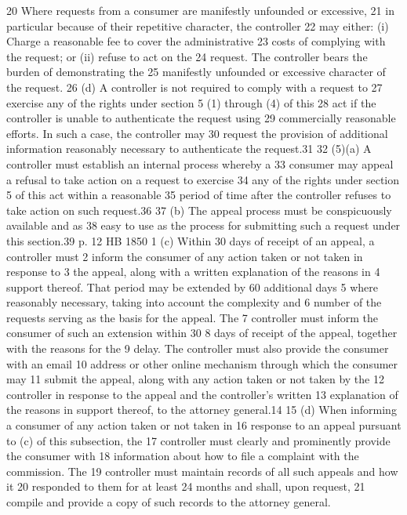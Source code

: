 20 Where requests from a consumer are manifestly unfounded or excessive,
21 in particular because of their repetitive character, the controller
22 may either: (i) Charge a reasonable fee to cover the administrative
23 costs of complying with the request; or (ii) refuse to act on the
24 request. The controller bears the burden of demonstrating the
25 manifestly unfounded or excessive character of the request.
26 (d) A controller is not required to comply with a request to
27 exercise any of the rights under section 5 (1) through (4) of this
28 act if the controller is unable to authenticate the request using
29 commercially reasonable efforts. In such a case, the controller may
30 request the provision of additional information reasonably necessary
to authenticate the request.31
32 (5)(a) A controller must establish an internal process whereby a
33 consumer may appeal a refusal to take action on a request to exercise
34 any of the rights under section 5 of this act within a reasonable
35 period of time after the controller refuses to take action on such
request.36
37 (b) The appeal process must be conspicuously available and as
38 easy to use as the process for submitting such a request under this
section.39
p. 12 HB 1850
1 (c) Within 30 days of receipt of an appeal, a controller must
2 inform the consumer of any action taken or not taken in response to
3 the appeal, along with a written explanation of the reasons in
4 support thereof. That period may be extended by 60 additional days
5 where reasonably necessary, taking into account the complexity and
6 number of the requests serving as the basis for the appeal. The
7 controller must inform the consumer of such an extension within 30
8 days of receipt of the appeal, together with the reasons for the
9 delay. The controller must also provide the consumer with an email
10 address or other online mechanism through which the consumer may
11 submit the appeal, along with any action taken or not taken by the
12 controller in response to the appeal and the controller's written
13 explanation of the reasons in support thereof, to the attorney
general.14
15 (d) When informing a consumer of any action taken or not taken in
16 response to an appeal pursuant to (c) of this subsection, the
17 controller must clearly and prominently provide the consumer with
18 information about how to file a complaint with the commission. The
19 controller must maintain records of all such appeals and how it
20 responded to them for at least 24 months and shall, upon request,
21 compile and provide a copy of such records to the attorney general.
